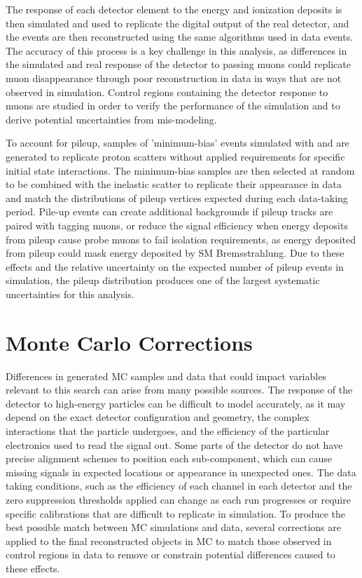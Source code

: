 The response of each detector element to the energy and ionization deposits is then simulated and used to replicate the digital output of the real detector, and the events are then reconstructed using the same algorithms used in data events.
The accuracy of this process is a key challenge in this analysis, as differences in the simulated and real response of the detector to passing muons could replicate muon disappearance through poor reconstruction in data in ways that are not observed in simulation. 
Control regions containing the detector response to muons are studied in order to verify the performance of the simulation and to derive potential uncertainties from mis-modeling.

To account for pileup, samples of 'minimum-bias' events simulated with \pythia and \geant are generated to replicate proton scatters without applied requirements for specific initial state interactions.
The minimum-bias samples are then selected at random to be combined with the inelastic scatter to replicate their appearance in data and match the distributions of pileup vertices expected during each data-taking period.
Pile-up events can create additional backgrounds if pileup tracks are paired with tagging muons, or reduce the signal efficiency when energy deposits from pileup cause probe muons to fail isolation requirements, as energy deposited from pileup could mask energy deposited by SM Bremsstrahlung.
Due to these effects and the relative uncertainty on the expected number of pileup events in simulation, the pileup distribution produces one of the largest systematic uncertainties for this analysis.

\section{Monte Carlo Corrections}
Differences in generated MC samples and data that could impact variables relevant to this search can arise from many possible sources.
The response of the detector to high-energy particles can be difficult to model accurately, as it may depend on the exact detector configuration and geometry, the complex interactions that the particle undergoes, and the efficiency of the particular electronics used to read the signal out.
Some parts of the detector do not have precise alignment schemes to position each sub-component, which can cause missing signals in expected locations or appearance in unexpected ones. 
The data taking conditions, such as the efficiency of each channel in each detector and the zero suppression thresholds applied can change as each run progresses or require specific calibrations that are difficult to replicate in simulation.
To produce the best possible match between MC simulations and data, several corrections are applied to the final reconstructed objects in MC to match those observed in control regions in data to remove or constrain potential differences caused to these effects.

